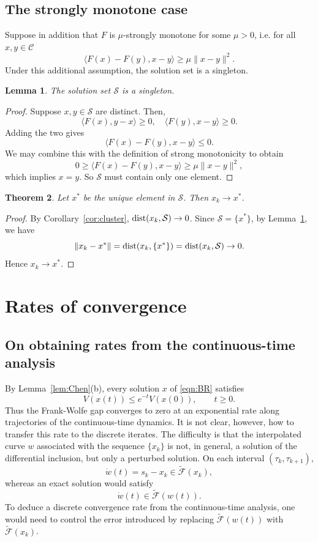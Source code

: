 \documentclass[pdflatex,sn-mathphys-num]{sn-jnl}%
\newcommand\dist{\mathop{\rm dist}}
\newcommand\C{\mathcal{C}}
\newcommand\mF{\mathcal{F}}
\newcommand\tmF{\widetilde{\mF}}
\newcommand\dw{\dot{w}}
\newcommand\mS{\mathcal{S}}
\theoremstyle{thmstyleone}%
\newtheorem{theorem}{Theorem}%
\newtheorem{lemma}[theorem]{Lemma}%
\theoremstyle{thmstyletwo}%
\theoremstyle{thmstylethree}%
\begin{document}
\subsection{The strongly monotone case}
Suppose in addition that $F$ is $\mu$-strongly monotone for some $\mu > 0$, i.e. for all $x,y\in \C$
\[
  \langle{F(x) - F(y), x - y}\rangle \geq \mu\lVert x - y\rVert^2.
\]
Under this additional assumption, the solution set is a singleton.
\begin{lemma} \label{lem:singleton}
  The solution set $\mS$ is a singleton.
\end{lemma}
\begin{proof}
  Suppose $x,y \in \mS$ are distinct. Then,
  \[
    \langle{F(x), y - x}\rangle \geq 0,\quad \langle{F(y), x - y}\rangle \geq 0.
  \]
  Adding the two gives
  \[
    \langle{F(x) - F(y), x - y}\rangle \leq 0.
  \]
  We may combine this with the definition of strong monotonicity to obtain
  \[
    0 \geq \langle{F(x) - F(y), x - y}\rangle \geq \mu\lVert x - y\rVert^2,
  \]
  which implies $x = y$. So $\mS$ must contain only one element.
\end{proof}

\begin{theorem}
  Let $x^*$ be the unique element in $\mS$. Then $x_k \to x^*$.
\end{theorem}
\begin{proof}
  By Corollary~\ref{cor:cluster}, $\dist(x_k,\mS) \to 0$.
  Since $\mS = \{x^*\}$, by Lemma~\ref{lem:singleton}, we have
  \[
    \lVert x_k-x^*\rVert = \dist(x_k,\{x^*\}) = \dist(x_k,\mS) \to 0.
  \]
  Hence $x_k\to x^*$.
\end{proof}

\section{Rates of convergence}
\subsection{On obtaining rates from the continuous-time analysis}
By Lemma~\ref{lem:Chen}(b), every solution $x$ of \eqref{eqn:BR} satisfies
\[
  V(x(t)) \leq e^{-t}V(x(0)), \qquad t \geq 0.
\]
Thus the Frank-Wolfe gap converges to zero at an exponential rate along trajectories of the continuous-time dynamics.
It is not clear, however, how to transfer this rate to the discrete iterates. The difficulty is that the interpolated
curve $w$ associated with the sequence $\{x_k\}$ is not, in general, a solution of the differential inclusion, but only a
perturbed solution. On each interval $(\tau_k,\tau_{k+1})$,
\[
  \dw(t)= s_k - x_k \in \tmF(x_k),
\]
whereas an exact solution would satisfy
\[
  \dw(t)\in \tmF(w(t)).
\]
To deduce a discrete convergence rate from the continuous-time analysis, one would need
to control the error introduced by replacing $\tmF(w(t))$ with $\tmF(x_k)$.
\end{document}
